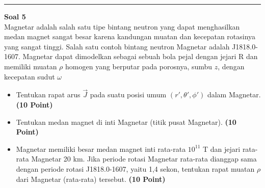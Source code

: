 \documentclass[a4paper, 11pt]{article}
\newenvironment{problem}[2][Soal]
    { \begin{mdframed}[backgroundcolor=violet!20] \textbf{#1 #2} \\}
    {  \end{mdframed}}
\begin{document}
\noindent\rule{7in}{2.8pt}

\pagebreak


\begin{problem}{5}
Magnetar adalah salah satu tipe bintang neutron yang dapat menghasilkan medan magnet sangat besar karena kandungan muatan dan kecepatan rotasinya yang sangat tinggi. Salah satu contoh bintang neutron Magnetar adalah J1818.0-1607. Magnetar dapat dimodelkan sebagai sebuah bola pejal dengan jejari R dan memiliki muatan $\rho$ homogen yang berputar pada porosnya, sumbu $z$, dengan kecepatan sudut $\omega$
\begin{itemize}
    \item[a.] Tentukan rapat arus $\vec{J}$ pada suatu posisi umum $(r', \theta ', \phi ')$ dalam Magnetar. \textbf{(10 Point)} 
    \item[b.] Tentukan medan magnet di inti Magnetar (titik pusat Magnetar). \textbf{(10 Point)}
    \item[c.] Magnetar memiliki besar medan magnet inti rata-rata $10^{11}$ T dan jejari rata-rata Magnetar 20 km. Jika periode rotasi Magnetar rata-rata dianggap sama dengan periode rotasi J1818.0-1607, yaitu 1,4 sekon, tentukan rapat muatan $\rho$ dari Magnetar (rata-rata) tersebut. \textbf{(10 Point)}
\end{itemize}

\end{problem}
\end{document}
